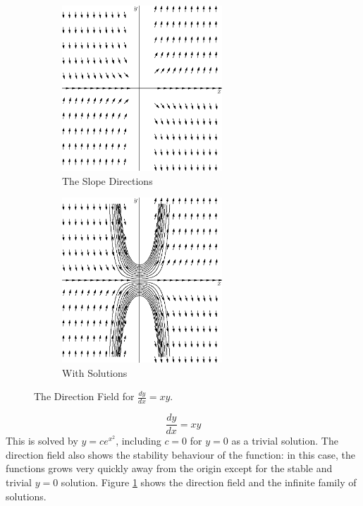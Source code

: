\documentclass[fleqn,letterpaper]{report}
\begin{document}
\begin{figure}[t]
\centering
\begin{subfigure}{.5\textwidth}
\centering
\includegraphics[width=6cm]{figure12.eps}
\caption{The Slope Directions}
\end{subfigure}%
\begin{subfigure}{.5\textwidth}
\centering
\includegraphics[width=6cm]{figure13.eps}
\caption{With Solutions}
\end{subfigure}
\caption{The Direction Field for $\frac{dy}{dx} = xy$.}
\label{figure-direction-field4}
\end{figure}

\begin{example}
\begin{equation*}
\frac{dy}{dx} = xy
\end{equation*}
This is solved by $y = ce^{x^2}$, including $c=0$ for $y=0$ as
a trivial solution. The direction field also shows the
stability behaviour of the function: in this case, the
functions grows very quickly away from the origin except for
the stable and trivial $y=0$ solution.  Figure
\ref{figure-direction-field4} shows the direction field and the infinite
family of solutions.
\end{example}
\end{document}

